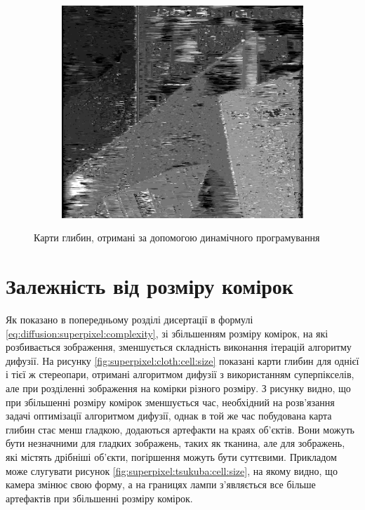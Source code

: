 \begin{figure}[h]
\begin{subfigure}[t]{0.32\textwidth}
    \end{subfigure}
    \hfill
    \begin{subfigure}[t]{0.32\textwidth}
        \centering
        \includegraphics[width=\textwidth]{images/poster_dynamic_result}
    \end{subfigure}
    \caption{Карти глибин, отримані за допомогою динамічного програмування}
    \label{fig:result:dynamic}
\end{figure}

\section{Залежність від розміру комірок}

Як показано в попередньому розділі дисертації в формулі
\eqref{eq:diffusion:superpixel:complexity},
зі збільшенням розміру комірок, на які розбивається зображення,
зменшується складність виконання ітерацій алгоритму дифузії.
На рисунку \ref{fig:superpixel:cloth:cell:size}
показані карти глибин для однієї і тієї ж стереопари,
отримані алгоритмом дифузії з використанням суперпікселів,
але при розділенні зображення на комірки різного розміру.
З рисунку видно, що при збільшенні розміру комірок зменшується час,
необхідний на розв'язання задачі оптимізації алгоритмом дифузії,
однак в той же час побудована карта глибин стає менш гладкою,
додаються артефакти на краях об'єктів.
Вони можуть бути незначними для гладких зображень, таких як тканина,
але для зображень, які містять дрібніші об'єкти,
погіршення можуть бути суттєвими.
Прикладом може слугувати рисунок \ref{fig:superpixel:tsukuba:cell:size},
на якому видно, що камера змінює свою форму,
а на границях лампи з'являється все більше артефактів при збільшенні розміру комірок.

